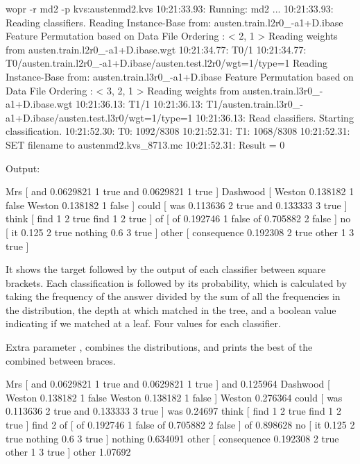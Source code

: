 \documentclass[a4paper,10pt,twoside]{report}
\begin{document}
\begin{bash}{}
wopr -r md2 -p kvs:austenmd2.kvs
10:21:33.93: Running: md2
...
10:21:33.93: Reading classifiers.
Reading Instance-Base from: austen.train.l2r0_-a1+D.ibase
Feature Permutation based on Data File Ordering :
< 2, 1 >
Reading weights from austen.train.l2r0_-a1+D.ibase.wgt
10:21:34.77: T0/1
10:21:34.77: T0/austen.train.l2r0_-a1+D.ibase/austen.test.l2r0/wgt=1/type=1
Reading Instance-Base from: austen.train.l3r0_-a1+D.ibase
Feature Permutation based on Data File Ordering :
< 3, 2, 1 >
Reading weights from austen.train.l3r0_-a1+D.ibase.wgt
10:21:36.13: T1/1
10:21:36.13: T1/austen.train.l3r0_-a1+D.ibase/austen.test.l3r0/wgt=1/type=1
10:21:36.13: Read classifiers. Starting classification.
10:21:52.30: T0: 1092/8308
10:21:52.31: T1: 1068/8308
10:21:52.31: SET filename to austenmd2.kvs_8713.mc
10:21:52.31: Result = 0
\end{bash}

Output:
\begin{wout}{}
Mrs [ and 0.0629821 1 true and 0.0629821 1 true ]
Dashwood [ Weston 0.138182 1 false Weston 0.138182 1 false ]
could [ was 0.113636 2 true and 0.133333 3 true ]
think [ find 1 2 true find 1 2 true ]
of [ of 0.192746 1 false of 0.705882 2 false ]
no [ it 0.125 2 true nothing 0.6 3 true ]
other [ consequence 0.192308 2 true other 1 3 true ]
\end{wout}

It shows the target followed by the output of each classifier between
square brackets. Each classification is followed by its probability,
which is calculated by taking the frequency of the answer divided by
the sum of all the frequencies in the distribution, the depth at which
\Timbl{} matched in the tree, and a boolean value indicating if we
matched at a leaf. Four values for each classifier.

\par
Extra parameter , combines the distributions, and prints the
best of the combined between braces.

\begin{wout}{}
Mrs [ and 0.0629821 1 true and 0.0629821 1 true ] { and 0.125964 }
Dashwood [ Weston 0.138182 1 false Weston 0.138182 1 false ] { Weston 0.276364 }
could [ was 0.113636 2 true and 0.133333 3 true ] { was 0.24697 }
think [ find 1 2 true find 1 2 true ] { find 2 }
of [ of 0.192746 1 false of 0.705882 2 false ] { of 0.898628 }
no [ it 0.125 2 true nothing 0.6 3 true ] { nothing 0.634091 }
other [ consequence 0.192308 2 true other 1 3 true ] { other 1.07692 }
\end{wout}
\end{document}
